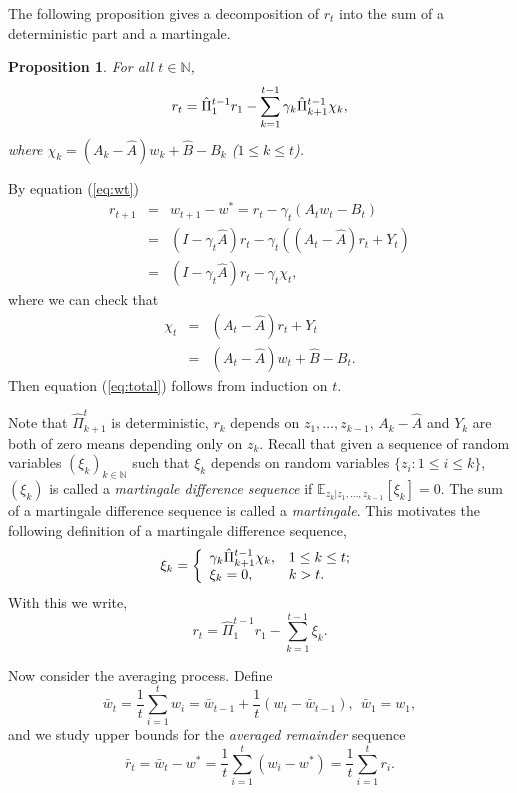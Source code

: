 \documentclass[twoside,twocolumn,journal]{IEEEtran}
\newtheorem{prop}[thm]{Proposition}
\newenvironment{pf}[1][Proof]{\medskip\noindent\hspace{1em}{\itshape #1: }}{\hspace*{\fill}~\QED\par\endtrivlist\medskip}
\def\N{{\mathbb N}}
\def\E{{\mathbb E}}        %
\begin{document}
The following proposition gives a decomposition of $r_t$ into the sum of a deterministic part and a martingale.

\medskip

\begin{prop} For all $t\in \N$,
\begin{equation} \label{eq:total}
r_{t} = \hat{\Pi}_1^{t-1} r_1 -
\sum_{k=1}^{t-1}\gamma_k  \Hat{\Pi}_{k+1}^{t-1} \chi_k,
\end{equation}
where $\chi_k=(A_k - \hat{A}) w_k + \hat{B}-B_k$ ($1\leq k \leq t$).
\end{prop}

\begin{pf} By equation (\ref{eq:wt})
\begin{eqnarray*}
r_{t+1} & = & w_{t+1}-w^\ast = r_{t} - \gamma_{t} (A_{t} w_{t} - B_{t}) \\
& = & (I - \gamma_t \hat{A}) r_t  - \gamma_t ((A_t-\hat{A})r_t + Y_t ) \\
& = & (I - \gamma_t \hat{A}) r_t - \gamma_t \chi_t,
\end{eqnarray*}
where we can check that
\begin{eqnarray*}
\chi_t & = & (A_t - \hat{A})r_t + Y_t \\
&  = & (A_t - \hat{A}) w_t + \hat{B}- B_t.
\end{eqnarray*}
Then equation (\ref{eq:total}) follows from induction on $t$.
\end{pf}

Note that $\hat{\Pi}_{k+1}^t$ is deterministic, $r_k$ depends on
$z_1,\dots,z_{k-1}$, $A_k-\hat{A}$ and $Y_k$ are both of zero
means depending only on $z_k$. Recall that given a sequence of random variables $(\xi_k)_{k\in \N}$ such that $\xi_k$ depends on
random variables $\{z_i:1\leq i \leq k\}$, $(\xi_k)$ is called a \emph{martingale difference sequence}
if $\E_{z_k|z_1,\ldots,z_{k-1}}[\xi_k]=0$. The sum of a martingale difference sequence is called a \emph{martingale}. This motivates
the following definition of a martingale difference sequence,
\[
\xi_k = \left\{
\begin{array}{ll}
\gamma_k \Hat{\Pi}_{k+1}^{t-1} \chi_k, & 1\leq k\leq t; \\
\xi_k=0, & k> t.
\end{array}
\right.
\]
With this we write,
\begin{equation} \label{eq:total1}
r_{t} = \hat{\Pi}_1^{t-1} r_1 - \sum_{k=1}^{t-1}\xi_k.
\end{equation}

Now consider the averaging process. Define
\[ \bar{w}_{t} = \frac{1}{t}\sum_{i=1}^t w_i=\bar{w}_{t-1} + \frac{1}{t} (w_t-\bar{w}_{t-1}), \ \ \bar{w}_1=w_1, \]
and we study upper bounds for the \emph{averaged remainder} sequence
\[ \bar{r}_{t} = \bar{w}_{t} - w^\ast = \frac{1}{t} \sum_{i=1}^{t} (w_i - w^\ast) = \frac{1}{t} \sum_{i=1}^{t} r_i. \]
\end{document}
